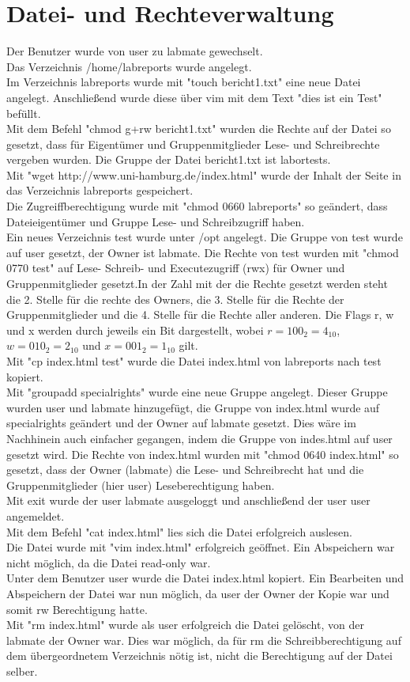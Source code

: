 \documentclass[12pt]{article}
\theoremstyle{plain}
\begin{document}
\section{Datei- und Rechteverwaltung}
Der Benutzer wurde von user zu labmate gewechselt. \\
Das Verzeichnis /home/labreports wurde angelegt. \\
Im Verzeichnis labreports wurde mit "touch bericht1.txt" eine neue Datei angelegt. Anschließend wurde diese über vim mit dem Text "dies ist ein Test" befüllt.\\
Mit dem Befehl "chmod g+rw bericht1.txt" wurden die Rechte auf der Datei so gesetzt, dass für Eigentümer und Gruppenmitglieder Lese- und Schreibrechte vergeben wurden. Die Gruppe der Datei bericht1.txt ist labortests.\\
Mit "wget http://www.uni-hamburg.de/index.html" wurde der Inhalt der Seite in das Verzeichnis labreports gespeichert.\\
Die Zugreiffberechtigung wurde mit "chmod 0660 labreports" so geändert, dass Dateieigentümer und Gruppe Lese- und Schreibzugriff haben.\\
Ein neues Verzeichnis test wurde unter /opt angelegt. Die Gruppe von test wurde auf user gesetzt, der Owner ist labmate.
Die Rechte von test wurden mit "chmod 0770 test" auf Lese- Schreib- und Executezugriff (rwx) für Owner und Gruppenmitglieder gesetzt.In der Zahl mit der die Rechte gesetzt werden steht die 2. Stelle für die rechte des Owners, die 3. Stelle für die Rechte der Gruppenmitglieder und die 4. Stelle für die Rechte aller anderen. Die Flags r, w und x werden durch jeweils ein Bit dargestellt, wobei $r=100_2=4_{10}$, $w=010_2=2_{10}$ und $x=001_2=1_{10}$ gilt.\\
Mit "cp index.html test" wurde die Datei index.html von labreports nach test kopiert.\\
Mit "groupadd specialrights" wurde eine neue Gruppe angelegt. Dieser Gruppe wurden user und labmate hinzugefügt, die Gruppe von index.html wurde auf specialrights geändert und der Owner auf labmate gesetzt. Dies wäre im Nachhinein auch einfacher gegangen, indem die Gruppe von indes.html auf user gesetzt wird. Die Rechte von index.html wurden mit "chmod 0640 index.html" so gesetzt, dass der Owner (labmate) die Lese- und Schreibrecht hat und die Gruppenmitglieder (hier user) Leseberechtigung haben.\\
Mit exit wurde der user labmate ausgeloggt und anschließend der user user angemeldet.\\
Mit dem Befehl "cat index.html" lies sich die Datei erfolgreich auslesen.\\
Die Datei wurde mit "vim index.html" erfolgreich geöffnet. Ein Abspeichern war nicht möglich, da die Datei read-only war.\\
Unter dem Benutzer user wurde die Datei index.html kopiert. Ein Bearbeiten und Abspeichern der Datei war nun möglich, da user der Owner der Kopie war und somit rw Berechtigung hatte.\\
Mit "rm index.html" wurde als user erfolgreich die Datei gelöscht, von der labmate der Owner war. Dies war möglich, da für rm die Schreibberechtigung auf dem übergeordnetem Verzeichnis nötig ist, nicht die Berechtigung auf der Datei selber.
\end{document}
